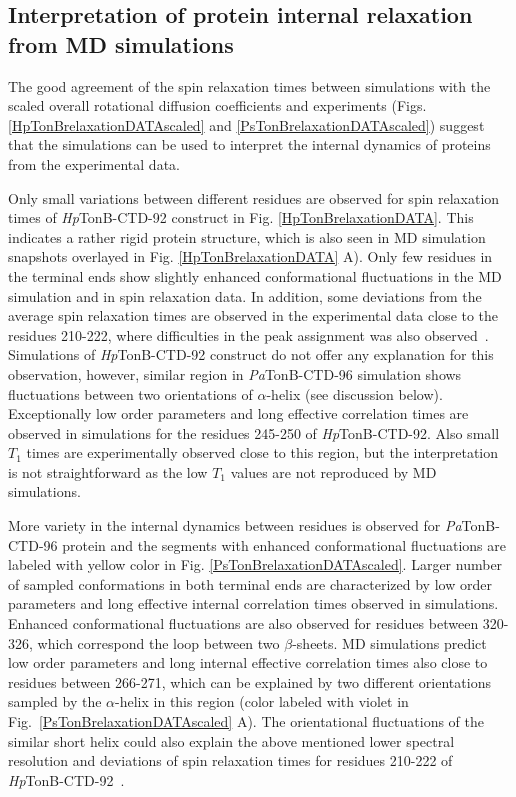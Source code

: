 \documentclass[journal=jpcbfk,manuscript=article]{achemso}
\begin{document}
\subsection{Interpretation of protein internal relaxation from MD simulations}
The good agreement of the spin relaxation times between simulations
with the scaled overall rotational diffusion coefficients and
experiments (Figs. \ref{HpTonBrelaxationDATAscaled} and \ref{PsTonBrelaxationDATAscaled})
suggest that the simulations can be used to interpret the internal
dynamics of proteins from the experimental data.

Only small variations between different residues are observed
for spin relaxation times of {\it Hp}TonB-CTD-92 construct in Fig. \ref{HpTonBrelaxationDATA}.
This indicates a rather rigid protein structure, which is also seen in
MD simulation snapshots overlayed in Fig. \ref{HpTonBrelaxationDATA} A).
Only few residues in the terminal ends show slightly
enhanced conformational fluctuations in the MD simulation and in
spin relaxation data. In addition, some deviations from the average spin relaxation times
are observed in the experimental data close to the residues 210-222, where  
difficulties in the peak assignment was also observed~\cite{ciragan16}.
Simulations of {\it Hp}TonB-CTD-92 construct do not offer any explanation for this
observation, however, similar region in {\it Pa}TonB-CTD-96 simulation shows 
fluctuations between two orientations of $\alpha$-helix (see discussion below).
Exceptionally low order parameters and long effective correlation times 
are observed in simulations for the residues 245-250 of {\it Hp}TonB-CTD-92.
Also small $T_1$ times are experimentally observed close to this region,
but the interpretation is not straightforward as the low $T_1$ values 
are not reproduced by MD simulations.

More variety in the internal dynamics between residues is observed for {\it Pa}TonB-CTD-96
protein and the segments with enhanced conformational fluctuations are labeled with yellow color
in Fig. \ref{PsTonBrelaxationDATAscaled}.
Larger number of sampled conformations in both terminal ends
are characterized by low order parameters and long effective internal correlation times
observed in simulations. 
Enhanced conformational fluctuations are also observed for residues between 320-326,
which correspond the loop between two $\beta$-sheets.
MD simulations predict low order parameters and long internal effective correlation
times also close to residues between 266-271, which can be explained by  
two different orientations sampled by the $\alpha$-helix in this region
(color labeled with violet in Fig.~\ref{PsTonBrelaxationDATAscaled} A).
The orientational fluctuations of the similar short helix could also explain the above mentioned
lower spectral resolution and deviations of spin relaxation times
for residues 210-222 of {\it Hp}TonB-CTD-92~\cite{ciragan16}.
\end{document}
